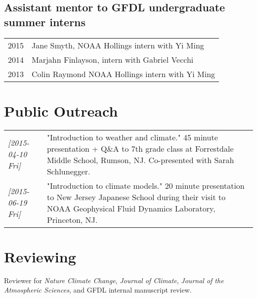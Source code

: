\documentclass{article}
\begin{document}
\subsection*{Assistant mentor to GFDL undergraduate summer interns}
\label{sec:orgdc20688}
\begin{center}
\begin{tabularx}{\textwidth}{lX}
2015 & Jane Smyth, NOAA Hollings intern with Yi Ming\\
2014 & Marjahn Finlayson, intern with Gabriel Vecchi\\
2013 & Colin Raymond NOAA Hollings intern with Yi Ming\\
\end{tabularx}
\end{center}
\section*{Public Outreach}
\label{sec:org5c54568}
\begin{center}
\begin{tabularx}{\textwidth}{lX}
\textit{[2015-04-10 Fri]} & "Introduction to weather and climate."  45 minute presentation + Q\&A to 7th grade class at Forrestdale Middle School, Rumson, NJ.  Co-presented with Sarah Schlunegger.\\
\textit{[2015-06-19 Fri]} & "Introduction to climate models."  20 minute presentation to New Jersey Japanese School during their visit to NOAA Geophysical Fluid Dynamics Laboratory, Princeton, NJ.\\
\end{tabularx}
\end{center}
\section*{Reviewing}
\label{sec:org0aa4b49}
Reviewer for \emph{Nature Climate Change}, \emph{Journal of Climate}, \emph{Journal of the
Atmospheric Sciences}, and GFDL internal manuscript review.
\end{document}
